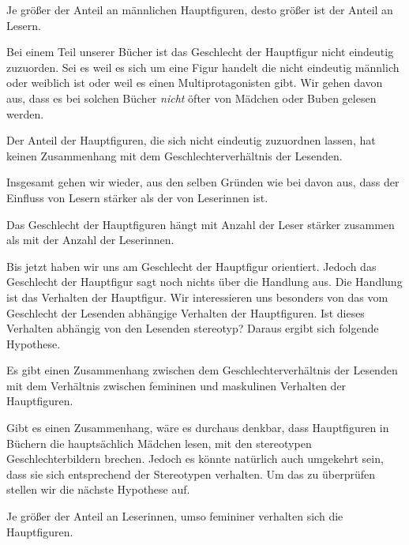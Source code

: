 \begin{subhyp}\label{h2.2}
       Je größer der Anteil an männlichen Hauptfiguren,
        desto größer ist der Anteil an Lesern.
\end{subhyp}

Bei einem Teil unserer Bücher ist das Geschlecht der Hauptfigur nicht
eindeutig zuzuorden. Sei es weil es sich um eine Figur handelt die nicht
eindeutig männlich oder weiblich ist oder weil es einen
Multiprotagonisten gibt. Wir gehen davon aus, dass es bei solchen Bücher
\emph{nicht} öfter von Mädchen oder Buben gelesen werden.

\begin{subhyp}\label{h2.3}
    Der Anteil der Hauptfiguren, die sich nicht eindeutig zuzuordnen lassen,   hat keinen Zusammenhang mit dem Geschlechterverhältnis der Lesenden.
\end{subhyp}

Insgesamt gehen wir wieder, aus den selben Gründen wie bei
 davon aus, dass der Einfluss von Lesern stärker als
der von Leserinnen ist.

\begin{subhyp}\label{h2.4}
   Das Geschlecht der Hauptfiguren hängt mit Anzahl der Leser stärker zusammen als mit der Anzahl der Leserinnen.
\end{subhyp}

Bis jetzt haben wir uns am Geschlecht der Hauptfigur orientiert. Jedoch
das Geschlecht der Hauptfigur sagt noch nichts über die Handlung aus.
Die Handlung ist das Verhalten der Hauptfigur. Wir interessieren uns
besonders von das vom Geschlecht der Lesenden abhängige Verhalten der
Hauptfiguren. Ist dieses Verhalten abhängig von den Lesenden stereotyp?
Daraus ergibt sich folgende Hypothese.

\begin{hyp}\label{h3}
   Es gibt einen Zusammenhang zwischen dem Geschlechterverhältnis der Lesenden
    mit  dem Verhältnis zwischen femininen und maskulinen Verhalten der Hauptfiguren.
\end{hyp}

Gibt es einen Zusammenhang, wäre es durchaus denkbar, dass Hauptfiguren
in Büchern die hauptsächlich Mädchen lesen, mit den stereotypen
Geschlechterbildern brechen. Jedoch es könnte natürlich auch umgekehrt
sein, dass sie sich entsprechend der Stereotypen verhalten. Um das zu
überprüfen stellen wir die nächste Hypothese auf.

\begin{subhyp}\label{h3.1}
    Je größer der Anteil an Leserinnen, umso femininer verhalten sich die Hauptfiguren.
\end{subhyp}

